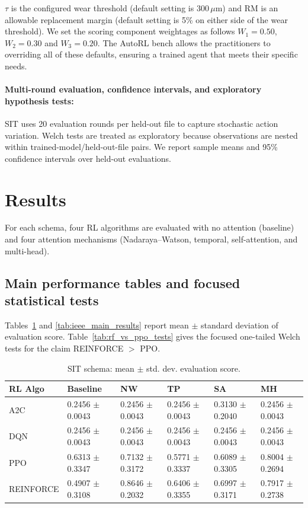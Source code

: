 \documentclass[sn-basic]{sn-jnl}%
\begin{document}
$\tau$ is the configured wear threshold (default setting is $300\,\mu\mathrm{m}$) and $\mathrm{RM}$ is an allowable replacement margin (default setting is 5\% on either side of the wear threshold). We set the scoring component weightages as follows $W_1 = 0.50$, $W_2 = 0.30$ and $W_3 = 0.20$. The AutoRL bench allows the practitioners to overriding all of these defaults, ensuring a trained agent that meets their specific needs. 

\paragraph{Multi-round evaluation, confidence intervals, and exploratory hypothesis tests:}
SIT uses 20 evaluation rounds per held-out file to capture stochastic action variation. Welch tests are treated as exploratory because observations are nested within trained-model/held-out-file pairs. We report sample means and 95\% confidence intervals over held-out evaluations.

\section{Results} \label{sec:results} %
For each schema, four RL algorithms are evaluated with no attention (baseline) and four attention mechanisms (Nadaraya--Watson, temporal, self-attention, and multi-head).

\subsection{Main performance tables and focused statistical tests}
\label{sec:hypothesis_tests}

Tables~\ref{tab:sit_main_results} and \ref{tab:ieee_main_results} report mean $\pm$ standard deviation of evaluation score. Table~\ref{tab:rf_vs_ppo_tests} gives the focused one-tailed Welch tests for the claim \textsc{REINFORCE} $>$ \textsc{PPO}.

\begin{table}[htbp]
	\centering
	\caption{SIT schema: mean $\pm$ std. dev. evaluation score.}
	\label{tab:sit_main_results}
	\begin{tabular}{l l l l l l}
	\toprule
	\textbf{RL Algo} & \textbf{Baseline} & \textbf{NW} & \textbf{TP} & \textbf{SA} & \textbf{MH}\\
	\midrule
	A2C & 0.2456 $\pm$ 0.0043 & 0.2456 $\pm$ 0.0043 & 0.2456 $\pm$ 0.0043 & 0.3130 $\pm$ 0.2040 & 0.2456 $\pm$ 0.0043\\
	DQN & 0.2456 $\pm$ 0.0043 & 0.2456 $\pm$ 0.0043 & 0.2456 $\pm$ 0.0043 & 0.2456 $\pm$ 0.0043 & 0.2456 $\pm$ 0.0043\\
	PPO & 0.6313 $\pm$ 0.3347 & 0.7132 $\pm$ 0.3172 & 0.5771 $\pm$ 0.3337 & 0.6089 $\pm$ 0.3305 & 0.8004 $\pm$ 0.2694\\
	REINFORCE & 0.4907 $\pm$ 0.3108 & 0.8646 $\pm$ 0.2032 & 0.6406 $\pm$ 0.3355 & 0.6997 $\pm$ 0.3171 & 0.7917 $\pm$ 0.2738\\
	\bottomrule
	\end{tabular}
\end{table}
\end{document}
